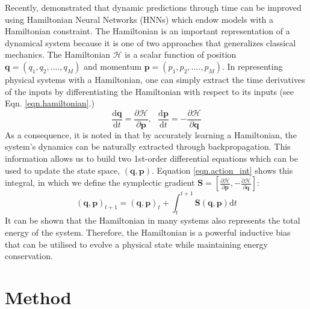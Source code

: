 \documentclass[twoside]{article}
\begin{document}
Recently, \cite{greydanus_hamiltonian_2019} demonstrated that dynamic predictions through time can be improved using Hamiltonian Neural Networks (HNNs) which endow models with a Hamiltonian constraint. The Hamiltonian is an important representation of a dynamical system because it is one of two approaches that generalizes classical mechanics. The Hamiltonian $\mathcal{H}$ is a scalar function of position $\mathbf{q} = (q_1,q_2,....,q_M)$ and momentum $\mathbf{p} = (p_1,p_2,....,p_M)$. In representing physical systems with a Hamiltonian, one can simply extract the time derivatives of the inputs by differentiating the Hamiltonian with respect to its inputs (see Eqn. \ref{eqn.hamiltonian}.)
\begin{equation}
\frac{\mathrm{d}\mathbf{q}}{\mathrm{d}t} = \frac{\partial \mathcal{H}}{\partial \mathbf{p}}, ~~~
\frac{\mathrm{d}\mathbf{p}}{\mathrm{d}t} = -\frac{\partial \mathcal{H}}{\partial \mathbf{q}}
\label{eqn.hamiltonian}
\end{equation}
As a consequence, it is noted in \cite{greydanus_hamiltonian_2019} that by accurately learning a Hamiltonian, the system's dynamics can be naturally extracted through backpropagation. This information allows us to build two 1st-order differential equations which can be used to update the state space, $(\mathbf{q},\mathbf{p})$. Equation \ref{eqn.action_int} shows this integral, in which we define the symplectic gradient $\mathbf{S}  = \left [ \frac{\partial \mathcal{H}}{\partial \mathbf{p}},-\frac{\partial \mathcal{H}}{\partial \mathbf{q}} \right ] $:
\begin{equation}
(\mathbf{q},\mathbf{p})_{t+1} = (\mathbf{q},\mathbf{p})_t + \int_t^{t+1} \mathbf{S}(\mathbf{q},\mathbf{p}) \mathrm{d}t
\label{eqn.action_int}
\end{equation}
It can be shown that the Hamiltonian in many systems also represents the total energy of the system. Therefore, the Hamiltonian is a powerful inductive bias that can be utilised to evolve a physical state while maintaining energy conservation.

\section{Method}
\end{document}
